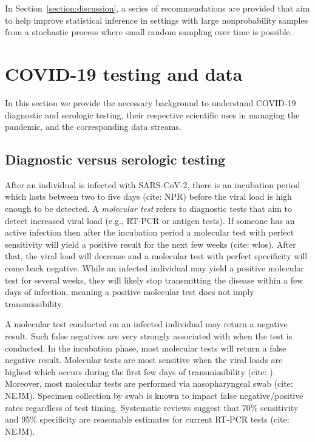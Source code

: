 \documentclass[11pt]{amsart}
\begin{document}
In Section~\ref{section:discussion}, a series of recommendations are provided that aim to help improve statistical inference in settings with large nonprobability samples from a stochastic process where small random sampling over time is possible.

\section{COVID-19 testing and data}
\label{section:data}

In this section we provide the necessary background to understand COVID-19 diagnostic and serologic testing, their respective scientific uses in managing the pandemic, and the corresponding data streams.

\subsection{Diagnostic versus serologic testing}
\label{section:testinginfo}


After an individual is infected with SARS-CoV-2, there is an incubation period which lasts between two to five days (cite: NPR) before the viral load is high enough to be detected.  A \emph{molecular test} refers to diagnostic tests that aim to detect increased viral load (e.g., RT-PCR or antigen tests).  If someone has an active infection then after the incubation period a molecular test with perfect sensitivity will yield a positive result for the next few weeks (cite: wlos).  After that, the viral load will decrease and a molecular test with perfect specificity will come back negative. While an infected individual may yield a positive molecular test for several weeks, they will likely stop transmitting the disease within a few days of infection, meaning a positive molecular test does not imply transmissibility.

A molecular test conducted on an infected individual may return a negative result.  Such false negatives are very strongly associated with when the test is conducted.  In the incubation phase, most molecular tests will return a false negative result.  Molecular tests are most sensitive when the viral loads are highest which occurs during the first few days of transmissibility (cite: ).   Moreover, most molecular tests are performed via nasopharyngeal swab (cite: NEJM).  Specimen collection by swab is known to impact false negative/positive rates regardless of test timing.   Systematic reviews suggest that 70\% sensitivity and 95\% specificity are reasonable estimates for current RT-PCR tests (cite: NEJM).
\end{document}
